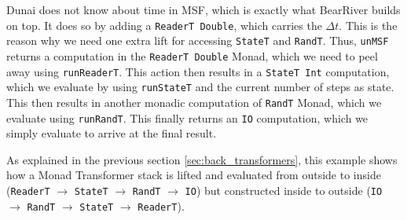 Dunai does not know about time in MSF, which is exactly what BearRiver builds on top. It does so by adding a \texttt{ReaderT Double}, which carries the $\Delta t$. This is the reason why we need one extra lift for accessing \texttt{StateT} and \texttt{RandT}. Thus, \texttt{unMSF} returns a computation in the \texttt{ReaderT Double} Monad, which we need to peel away using \texttt{runReaderT}. This action then results in a \texttt{StateT Int} computation, which we evaluate by using \texttt{runStateT} and the current number of steps as state. This then results in another monadic computation of \texttt{RandT} Monad, which we evaluate using \texttt{runRandT}. This finally returns an \texttt{IO} computation, which we simply evaluate to arrive at the final result.

As explained in the previous section \ref{sec:back_transformers}, this example shows how a Monad Transformer stack is lifted and evaluated from outside to inside (\texttt{ReaderT} $\rightarrow$ \texttt{StateT} $\rightarrow$ \texttt{RandT} $\rightarrow$ \texttt{IO}) but constructed inside to outside (\texttt{IO} $\rightarrow$ \texttt{RandT} $\rightarrow$ \texttt{StateT} $\rightarrow$ \texttt{ReaderT}).